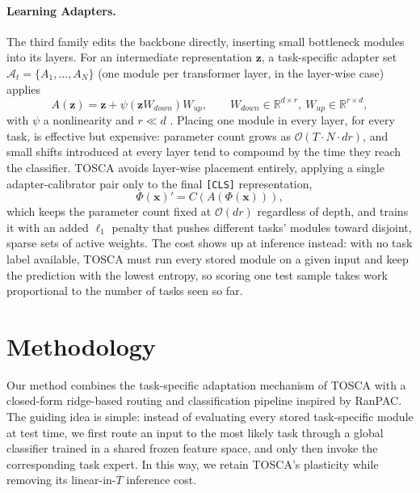 \documentclass{article}
\begin{document}
\paragraph{Learning Adapters.}
The third family edits the backbone directly, inserting small bottleneck
modules into its layers. For an intermediate representation $\mathbf{z}$, a
task-specific adapter set $\mathcal{A}_t = \{A_1, \ldots, A_N\}$ (one module
per transformer layer, in the layer-wise case) applies
\begin{equation}
  A(\mathbf{z}) = \mathbf{z} + \psi(\mathbf{z}W_{down})W_{up}, \qquad
  W_{down}\in\mathbb{R}^{d\times r},\ W_{up}\in\mathbb{R}^{r\times d},
  \label{eq:adapter}
\end{equation}
with $\psi$ a nonlinearity and $r \ll d$
\citep{zhou2024revisiting,zhou2024expandable,sun2025mos}. Placing one
module in every layer, for every task, is effective but expensive:
parameter count grows as $\mathcal{O}(T\!\cdot\! N\!\cdot\! dr)$, and small
shifts introduced at every layer tend to compound by the time they reach
the classifier. TOSCA \citep{yildirim2026unlocking} avoids layer-wise
placement entirely, applying a single adapter-calibrator pair only to the
final \texttt{[CLS]} representation,
\begin{equation}
  \Phi(\mathbf{x})' = C(A(\Phi(\mathbf{x}))),
  \label{eq:tosca-clsonly}
\end{equation}
which keeps the parameter count fixed at $\mathcal{O}(dr)$ regardless of
depth, and trains it with an added $\ell_1$ penalty that pushes different
tasks' modules toward disjoint, sparse sets of active weights. The cost
shows up at inference instead: with no task label available, TOSCA must
run every stored module on a given input and keep the prediction with the
lowest entropy, so scoring one test sample takes work proportional to the
number of tasks seen so far.

\section{Methodology}
\label{sec:method}




Our method combines the task-specific adaptation mechanism of TOSCA with a
closed-form ridge-based routing and classification pipeline inspired by
RanPAC. The guiding idea is simple: instead of evaluating every stored
task-specific module at test time, we first route an input to the most
likely task through a global classifier trained in a shared frozen feature
space, and only then invoke the corresponding task expert. In this way, we
retain TOSCA's plasticity while removing its linear-in-\(T\) inference
cost.
\end{document}
